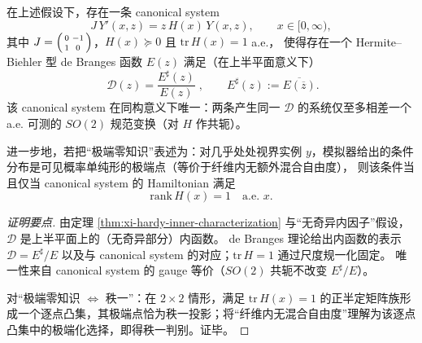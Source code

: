 \begin{theorem}\label{thm:xi-debranges-canonical-extreme-zk}
在上述假设下，存在一条 canonical system
\[
J\,Y'(x,z)=z\,H(x)\,Y(x,z),\qquad x\in[0,\infty),
\]
其中
\(
J=\begin{psmallmatrix}0&-1\\[2pt]1&0\end{psmallmatrix}
\)，\(H(x)\succeq 0\) 且 \(\mathrm{tr}\,H(x)=1\) a.e.，
使得存在一个 Hermite--Biehler 型 de Branges 函数 \(E(z)\) 满足（在上半平面意义下）
\[
\boxed{\;\mathcal{D}(z)=\frac{E^\sharp(z)}{E(z)}\;},
\qquad
E^\sharp(z):=\overline{E(\overline z)}.
\]
该 canonical system 在同构意义下唯一：两条产生同一 \(\mathcal{D}\) 的系统仅至多相差一个 a.e. 可测的 \(SO(2)\) 规范变换（对 \(H\) 作共轭）。
\par
进一步地，若把“极端零知识”表述为：对几乎处处视界实例 \(y\)，模拟器给出的条件分布是可见概率单纯形的极端点（等价于纤维内无额外混合自由度），
则该条件当且仅当 canonical system 的 Hamiltonian 满足
\[
\boxed{\;\mathrm{rank}\,H(x)=1\quad\text{a.e. }x.\;}
\]
\end{theorem}
\begin{proof}[证明要点]
由定理 \ref{thm:xi-hardy-inner-characterization} 与“无奇异内因子”假设，\(\mathcal{D}\) 是上半平面上的（无奇异部分）内函数。
de Branges 理论给出内函数的表示 \(\mathcal{D}=E^\sharp/E\) 以及与 canonical system 的对应；\(\mathrm{tr}\,H=1\) 通过尺度规一化固定。
唯一性来自 canonical system 的 gauge 等价（\(SO(2)\) 共轭不改变 \(E^\sharp/E\)）。
\par
对“极端零知识 \(\Leftrightarrow\) 秩一”：在 \(2\times 2\) 情形，满足 \(\mathrm{tr}\,H(x)=1\) 的正半定矩阵族形成一个逐点凸集，其极端点恰为秩一投影；将“纤维内无混合自由度”理解为该逐点凸集中的极端化选择，即得秩一判别。证毕。
\end{proof}

